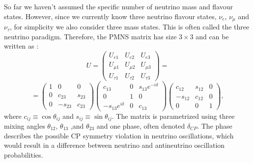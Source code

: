 So far we haven't assumed the specific number of neutrino mass and flavour states. However, since we currently know three neutrino flavour states, $\nu_e$, $\nu_\mu$ and $\nu_\tau$, for simplicity we also consider three mass states. This is often called the three neutrino paradigm. Therefore, the \gls{PMNS} matrix has size $3\times 3$ and can be written as \cite{FundamentalsOfNeutrinoPhysics.pdf}:
\[
U=
\begin{pmatrix}
 U_{e1}     & U_{e2}     & U_{e3}    \\
 U_{\mu 1}  & U_{\mu 2}  & U_{\mu 3} \\
 U_{\tau 1} & U_{\tau 2} & U_{\tau 3}
\end{pmatrix}
=
\]
\begin{equation}\label{param3}
=
\begin{pmatrix}
 1 & 0       & 0      \\
 0 & c_{23}  & s_{23} \\
 0 & -s_{23} & c_{23}
\end{pmatrix}
\begin{pmatrix}
 c_{13}              & 0 & s_{13}e^{-i\delta} \\
 0                   & 1 & 0                  \\
 -s_{13}e^{i\delta} & 0 & c_{13}
\end{pmatrix}
\begin{pmatrix}
 c_{12}  & s_{12} & 0 \\
 -s_{12} & c_{12} & 0 \\
 0       & 0      & 1
\end{pmatrix},
\end{equation}
where $c_{ij}\equiv\cos\theta_{ij}$ and $s_{ij}\equiv\sin\theta_{ij}$. The matrix is parametrized using three mixing angles $\theta_{12}$, $\theta_{13}$ ,and $\theta_{23}$ and one phase, often denoted $\delta_{CP}$. The phase describes the possible \gls{CP} symmetry violation in neutrino oscillations, which would result in a difference between neutrino and antineutrino oscillation probabilities.

